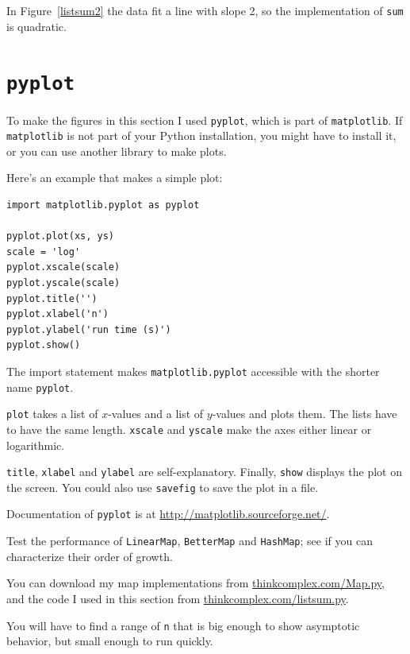 \documentclass[10pt]{book}
\begin{document}
In Figure~\ref{listsum2} the data fit a line with slope 2, so the
implementation of {\tt sum} is quadratic.


\section{{\tt pyplot}}
\label{pyplot}

To make the figures in this section I used {\tt pyplot}, which is part of
{\tt matplotlib}.  If {\tt matplotlib} is not part of your Python
installation, you might have to install it, or you can use another
library to make plots.

Here's an example that makes a simple plot:

\begin{verbatim}
import matplotlib.pyplot as pyplot

pyplot.plot(xs, ys)
scale = 'log'
pyplot.xscale(scale)
pyplot.yscale(scale)
pyplot.title('')
pyplot.xlabel('n')
pyplot.ylabel('run time (s)')
pyplot.show()
\end{verbatim}

The import statement makes {\tt matplotlib.pyplot} accessible
with the shorter name {\tt pyplot}.

{\tt plot} takes a list of $x$-values and a list of $y$-values and
plots them.  The lists have to have the same length.
{\tt xscale} and {\tt yscale} make the axes either linear or logarithmic.

{\tt title}, {\tt xlabel} and {\tt ylabel} are self-explanatory.
Finally, {\tt show} displays the plot on the screen.  You could also
use {\tt savefig} to save the plot in a file.

Documentation of {\tt pyplot} is at \url{http://matplotlib.sourceforge.net/}.


\begin{exercise}

Test the performance of
{\tt LinearMap}, {\tt BetterMap} and {\tt HashMap}; see if you
can characterize their order of growth.

You can download my map implementations from
\url{thinkcomplex.com/Map.py}, and the code I used in this section
from \url{thinkcomplex.com/listsum.py}.

You will have to find a range
of {\tt n} that is big enough to show asymptotic behavior, but small
enough to run quickly.

\end{exercise}
\end{document}
